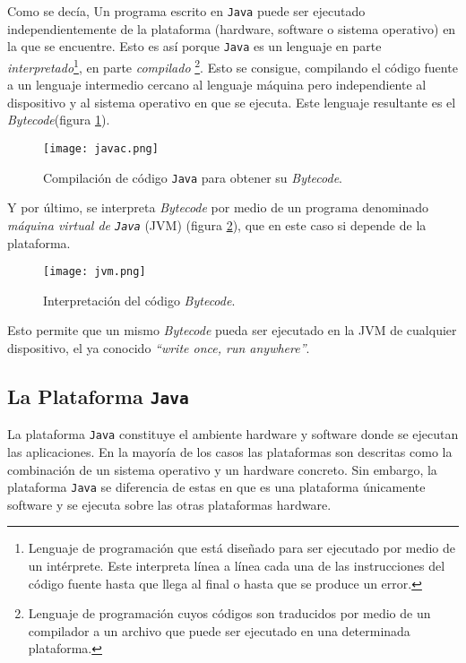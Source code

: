 Como se decía, Un programa escrito en \texttt{Java} puede ser ejecutado
independientemente de la plataforma (hardware, software o sistema operativo)
en la que se encuentre. Esto es así porque \texttt{Java} es un lenguaje en
parte \emph{interpretado}\footnote{Lenguaje de programación que está diseñado
para ser ejecutado por medio de un intérprete. Este interpreta línea
a línea cada una de las instrucciones del código fuente hasta que llega al
final o hasta que se produce un error.}, en parte \emph{compilado}
\footnote{Lenguaje de programación cuyos códigos son traducidos por medio de un 
compilador a un archivo que puede ser ejecutado en una determinada 
plataforma.}. Esto se consigue, compilando el código fuente a un lenguaje 
intermedio cercano al lenguaje máquina pero independiente al dispositivo y al 
sistema operativo en que se ejecuta. Este lenguaje resultante es el
\emph{Bytecode}(figura \ref{fig:javac}).

  \begin{figure}[H]
    \begin{center}
      \texttt{[image: javac.png]}
      \caption{Compilación de código \texttt{Java} para obtener su 
      \emph{Bytecode}.}
      \label{fig:javac}
    \end{center}
  \end{figure}

Y por último, se interpreta \emph{Bytecode} por medio de un programa
denominado \emph{máquina virtual de \texttt{Java}} (\acs{JVM}) (figura
\ref{fig:jvm}), que en este caso si depende de la plataforma.

  \begin{figure}[H]
    \begin{center}
      \texttt{[image: jvm.png]}
      \caption{Interpretación del código \emph{Bytecode}.}
      \label{fig:jvm}
    \end{center}
  \end{figure}

Esto permite que un mismo \emph{Bytecode} pueda ser ejecutado en la
\acs{JVM} de cualquier dispositivo, el ya conocido \emph{``write once, run
anywhere''}.

\subsection{La Plataforma \texttt{Java}}
La plataforma \texttt{Java} constituye el ambiente hardware y software donde
se ejecutan las aplicaciones. En la mayoría de los casos las plataformas son
descritas como la combinación de un sistema operativo y un hardware concreto.
Sin embargo, la plataforma \texttt{Java} se diferencia de estas en que es una
plataforma únicamente software y se ejecuta sobre las otras plataformas
hardware.

